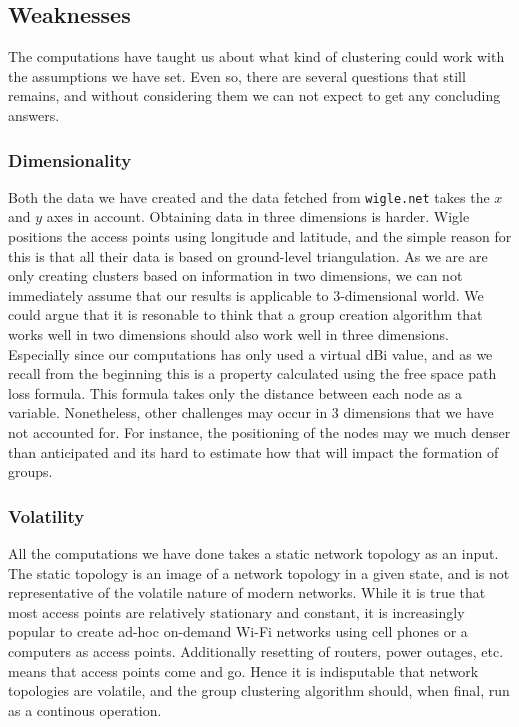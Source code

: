 \subsection{Weaknesses}
The computations have taught us about what kind of clustering could work with the assumptions we have set. Even so, there are several questions that still remains,
and without considering them we can not expect to get any concluding answers. 

\subsubsection{Dimensionality} 
Both the data we have created and the data fetched from \verb|wigle.net| takes the $x$ and $y$ axes in account. Obtaining data in three dimensions is harder.
Wigle positions the access points using longitude and latitude, and the simple reason for this is that all their data is based on ground-level triangulation.
As we are are only creating clusters based on information in two dimensions, we can not immediately assume that our results is applicable to 3-dimensional world. 
We could argue that it is resonable to think that a group creation algorithm that works well in two dimensions should also work well in three dimensions. Especially since our computations has only
used a virtual dBi value, and as we recall from the beginning this is a property calculated using the free space path loss formula. This formula takes only the distance between each node
as a variable. Nonetheless, other challenges may occur in 3 dimensions that we have not accounted for. For instance, 
the positioning of the nodes may we much denser than anticipated and its hard to estimate how that will impact the formation of groups. 

\subsubsection{Volatility} 
All the computations we have done takes a static network topology as an input. The static topology is an image of a network topology in a given state, and is not representative
of the volatile nature of modern networks. While it is true that most access points are relatively stationary and constant, it is increasingly popular to create
ad-hoc on-demand Wi-Fi networks using cell phones or a computers as access points. Additionally resetting of routers, power outages, etc. means that access points come and go. 
Hence it is indisputable that network topologies are volatile, and the group clustering algorithm should, when final, run as a continous operation. 

